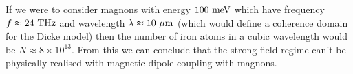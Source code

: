 \documentclass[
]{article}
\renewcommand{\[}{\begin{equation}}
\renewcommand{\]}{\end{equation}}
\begin{document}
If we were to consider magnons with energy \(100 \ \rm meV\) which have
frequency \(f \approx 24 \ \rm THz\) and wavelength
\(\lambda \approx 10 \ \rm \mu m\) (which would define a coherence
domain for the Dicke model) then the number of iron atoms in a cubic
wavelength would be \(N \approx 8 \times 10^{13}\). From this we can
conclude that the strong field regime can't be physically realised with
magnetic dipole coupling with magnons.

\printbibliography
\end{document}
